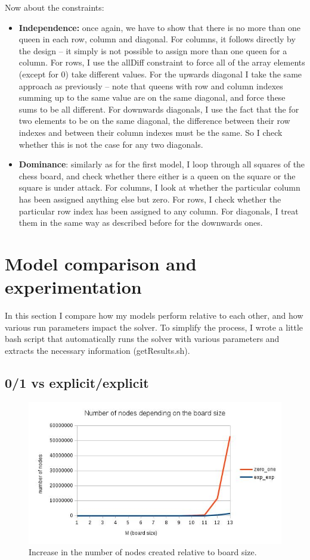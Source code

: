 \documentclass{report}
\newcommand{\tab}{\hspace*{1.5em}}
\begin{document}
Now about the constraints:
\begin{itemize}
\item \textbf{Independence:} once again, we have to show that there is no more than one queen in each row, column and diagonal. For columns, it follows directly by the design -- it simply is not possible to assign more than one queen for a column. For rows, I use the allDiff constraint to force all of the array elements (except for 0) take different values. For the upwards diagonal I take the same approach as previously -- note that queens with row and column indexes summing up to the same value are on the same diagonal, and force these sums to be all different. For downwards diagonals, I use the fact that the for two elements to be on the same diagonal, the difference between their row indexes and between their column indexes must be the same. So I check whether this is not the case for any two diagonals.
\item \textbf{Dominance}: similarly as for the first model, I loop through all squares of the chess board, and check whether there either is a queen on the square or the square is under attack. For columns, I look at whether the particular column has been assigned anything else but zero. For rows, I check whether the particular row index has been assigned to any column. For diagonals, I treat them in the same way as described before for the downwards ones.
\end{itemize}

\section*{Model comparison and experimentation}
\tab In this section I compare how my models perform relative to each other, and how various run parameters impact the solver. To simplify the process, I wrote a little bash script that automatically runs the solver with various parameters and extracts the necessary information (getResults.sh).

\subsection*{0/1 vs explicit/explicit}
\begin{figure} [\textwidth]
\includegraphics[scale=0.7]{images/numNodes.jpg}
\caption{Increase in the number of nodes created relative to board size.}
\end{figure}
\end{document}
